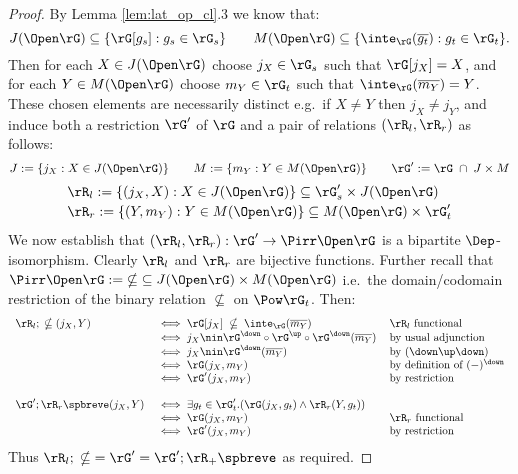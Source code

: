 \documentclass{article}
\begin{document}
\begin{proof}
  By Lemma \ref{lem:lat_op_cl}.3 we know that:
  \[
  J(\Open\rG) \subseteq \{ \rG[g_s] : g_s \in \rG_s \}
  \qquad
  M(\Open\rG) \subseteq \{ \inte_\rG(\overline{g_t}) : g_t \in \rG_t \}.
  \]
  Then for each $X \in J(\Open\rG)$ choose $j_X \in \rG_s$ such that $\rG[j_X] = X$, and for each $Y \in M(\Open\rG)$ choose $m_Y \in \rG_t$ such that $\inte_\rG(\overline{m_Y}) = Y$. These chosen elements are necessarily distinct e.g.\ if $X \neq Y$ then $j_X \neq j_Y$, and induce both a restriction $\rG'$ of $\rG$ and a pair of relations $(\rR_l,\rR_r)$ as follows:
  \[
  J := \{ j_X : X \in J(\Open\rG) \}
  \qquad
  M := \{ m_Y : Y \in M(\Open\rG) \}
  \qquad
  \rG' := \rG \;\cap \; J \times M
  \]
  \[
  \begin{tabular}{l}
  $\rR_l := \{ (j_X,X) : X \in J(\Open\rG) \} \subseteq \rG'_s \times J(\Open\rG)$
  \\[0.5ex]
  $\rR_r := \{ (Y,m_Y) : Y \in M(\Open\rG) \} \subseteq M(\Open\rG) \times \rG'_t$
  \end{tabular}
  \]
  We now establish that $(\rR_l,\rR_r) : \rG' \to \Pirr\Open\rG$ is a bipartite $\Dep$-isomorphism. Clearly $\rR_l$ and $\rR_r$ are bijective functions. Further recall that $\Pirr\Open\rG := \; \nsubseteq \; \subseteq J(\Open\rG) \times M(\Open\rG)$ i.e.\ the domain/codomain restriction of the binary relation $\nsubseteq$ on $\Pow \rG_t$. Then: 
  \[
  \begin{tabular}{lll}
  $\rR_l ; \; \nsubseteq (j_X,Y)$
  &
  $\iff \rG[j_X] \;\nsubseteq\; \inte_\rG(\overline{m_Y})$
  & $\rR_l$ functional
  \\&
  $\iff j_X \nin \rG^\down \circ \rG^\up \circ \rG^\down(\overline{m_Y})$
  & by usual adjunction
  \\&
  $\iff j_X \nin \rG^\down(\overline{m_Y})$
  & by $(\down\up\down)$
  \\&
  $\iff \rG(j_X,m_Y)$
  & by definition of $(-)^\down$
  \\&
  $\iff \rG'(j_X,m_Y)$
  & by restriction
  \\
  \\
  $\rG' ; \rR_r\spbreve (j_X,Y)$
  &
  $\iff \exists g_t \in \rG'_t.( \rG(j_X,g_t) \land \rR_r(Y,g_t) )$
  \\&
  $\iff \rG(j_X,m_Y)$
  & $\rR_r$ functional
  \\&
  $\iff \rG'(j_X,m_Y)$
  & by restriction
  \end{tabular}
  \]
  Thus $\rR_l ; \; \nsubseteq \; = \rG' = \rG' ; \rR_+\spbreve$ as required.
\end{proof}
\end{document}
